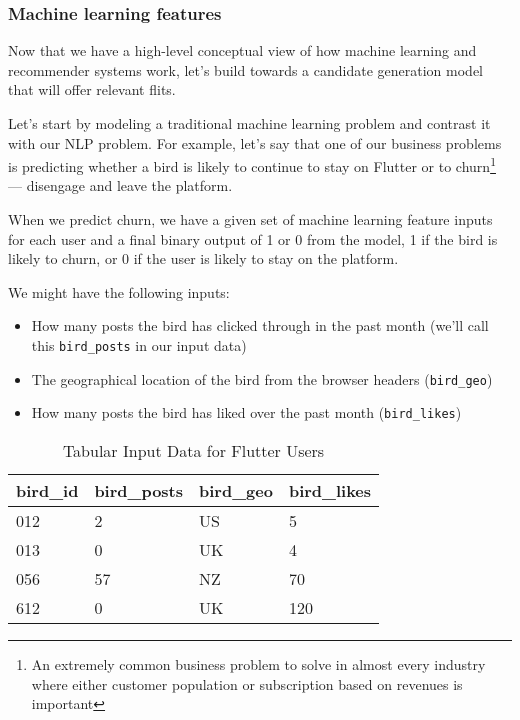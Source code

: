 \documentclass[11pt, table]{diazessay} %
\begin{document}
\begin{sloppypar}
\subsubsection{Machine learning features}

Now that we have a high-level conceptual view of how machine learning and recommender systems work, let's build towards a candidate generation model that will offer relevant flits.

Let's start by modeling a traditional machine learning problem and contrast it with our NLP problem. For example, let's say that one of our business problems is predicting whether a bird is likely to continue to stay on Flutter or to churn\footnote{An extremely common business problem to solve in almost every industry where either customer population or subscription based on revenues is important} --- disengage and leave the platform.

When we predict churn, we have a given set of machine learning feature inputs for each user and a final binary output of 1 or 0 from the model, 1 if the bird is likely to churn, or 0 if the user is likely to stay on the platform.

We might have the following inputs:

\begin{itemize}
  \item How many posts the bird has clicked through in the past month (we'll call this \texttt{bird_posts} in our input data)
  \item The geographical location of the bird from the browser headers (\texttt{bird_geo})
  \item How many posts the bird has liked over the past month (\texttt{bird_likes})
\end{itemize}



\begin{table}[H]
  \centering
    \caption{Tabular Input Data for Flutter Users}
\begin{tabular}{|l|l|l|l|}
\hline
\rowcolor[HTML]{D5E7F7}
bird\_id & bird\_posts & bird\_geo & bird\_likes \\ \hline
012 	 & 2  		 & US   	 & 5  		 \\ \hline
013 	 & 0  		 & UK   	 & 4  		 \\ \hline
056 	 & 57 		 & NZ   	 & 70 		 \\ \hline
612 	 & 0  		 & UK   	 & 120		 \\ \hline
\end{tabular}
\end{table}


\end{sloppypar}
\end{document}
